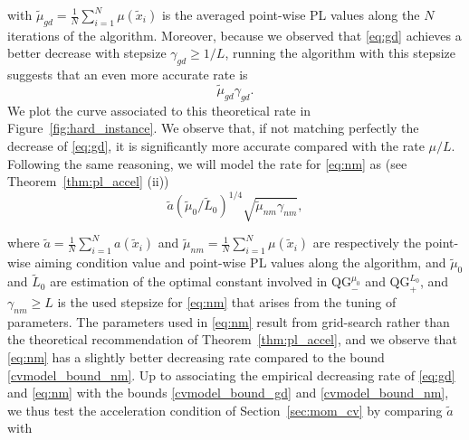 \documentclass{article}
\newcommand{\qg}{\text{QG}_{+}^{L_0}}
\newcommand{\qginf}{\text{QG}_{-}^{\mu_0}}
\theoremstyle{plain}
\theoremstyle{definition}
\theoremstyle{remark}
\begin{document}
with $\tilde \mu_{gd} = \frac{1}{N}\sum_{i=1}^N \mu(\tilde x_i)$ is the averaged point-wise PL values along the $N$ iterations of the algorithm. Moreover, because we observed that \eqref{eq:gd} achieves a better decrease with stepsize $\gamma_{gd} \ge 1/L$, running the algorithm with this stepsize suggests that an even more accurate rate is
\begin{equation}\label{cvmodel_bound_gd}
    \tilde \mu_{gd}\gamma_{gd}.
\end{equation}
We plot the curve associated to this theoretical rate in Figure~\ref{fig:hard_instance}. We observe that, if not matching perfectly the decrease of \eqref{eq:gd}, it is significantly more accurate compared with the rate $\mu/L$.
Following the same reasoning, we will model the rate for \eqref{eq:nm} as (see Theorem~\ref{thm:pl_accel} (ii))
\begin{equation}\label{cvmodel_bound_nm}
    \tilde a (\tilde \mu_0/ \tilde L_0)^{1/4} \sqrt{\tilde \mu_{nm}\gamma_{nm}},
\end{equation}

where $\tilde a = \frac{1}{N}\sum_{i=1}^N a(\tilde x_i)$ and $\tilde \mu_{nm} = \frac{1}{N}\sum_{i=1}^N \mu(\tilde x_i)$ are respectively the point-wise aiming condition value and point-wise PL values along the algorithm, and $\tilde \mu_0$ and $\tilde L_0$ are estimation of the optimal constant involved in $\qginf$ and $\qg$, and $\gamma_{nm}\ge L$ is the used stepsize for \eqref{eq:nm} that arises from the tuning of parameters. The parameters used in \eqref{eq:nm} result from grid-search rather than the theoretical recommendation of Theorem~\ref{thm:pl_accel}, and we observe that \eqref{eq:nm} has a slightly better decreasing rate compared to the bound \eqref{cvmodel_bound_nm}.
Up to associating the empirical decreasing rate of \eqref{eq:gd} and \eqref{eq:nm} with the bounds \eqref{cvmodel_bound_gd} and \eqref{cvmodel_bound_nm}, we thus test the acceleration condition of Section~\ref{sec:mom_cv} by comparing $\tilde a $ with
\end{document}
